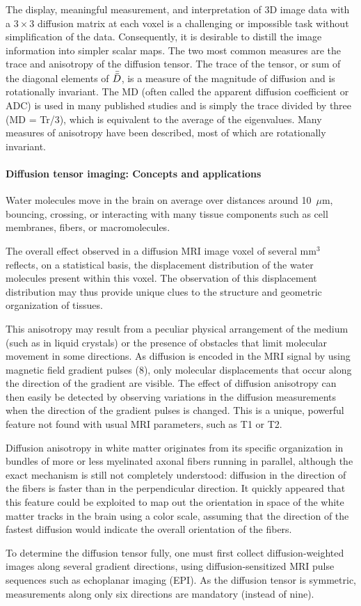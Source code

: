 {The display, meaningful measurement, and interpretation of 3D image data with a $3 \times 3$ diffusion matrix at each voxel is a challenging or impossible task without simplification of the data. Consequently, it is desirable to distill the image information into simpler scalar maps. The two most common measures are the trace and anisotropy of the diffusion tensor. The trace of the tensor, or sum of the diagonal elements of $\Bar{\bar{D}}$, is a measure of the magnitude of diffusion and is rotationally invariant. The MD (often called the apparent diffusion coefficient or ADC) is used in many published studies and is simply the trace divided by three (MD = Tr/3), which is equivalent to the average of the eigenvalues. Many measures of anisotropy have been described, most of which are rotationally invariant.}

\paragraph{Diffusion tensor imaging: Concepts and applications~\cite{lebihan2001}}{
Water molecules move in the brain on average over distances around 10~$\mu$m, bouncing, crossing, or interacting with many tissue components such as cell membranes, fibers, or macromolecules.

The overall effect observed in a diffusion MRI image voxel of several mm$^{3}$ reflects, on a statistical basis, the displacement distribution of the water molecules present within this voxel. The observation of this displacement distribution may thus provide unique clues to the structure and geometric organization of tissues.

This anisotropy may result from a peculiar physical arrangement of the medium (such as in liquid crystals) or the presence of obstacles that limit molecular movement in some directions. As diffusion is encoded in the MRI signal by using magnetic field gradient pulses (8), only molecular displacements that occur along the direction of the gradient are visible. The effect of diffusion anisotropy can then easily be detected by observing variations in the diffusion measurements when the direction of the gradient pulses is changed. This is a unique, powerful feature not found with usual MRI parameters, such as T1 or T2.

Diffusion anisotropy in white matter originates from its specific organization in bundles of more or less myelinated axonal fibers running in parallel, although the exact mechanism is still not completely understood: diffusion in the direction of the fibers is faster than in the perpendicular direction. It quickly appeared that this feature could be exploited to map out the orientation in space of the white matter tracks in the brain using a color scale, assuming that the direction of the fastest diffusion would indicate the overall orientation of the fibers.

To determine the diffusion tensor fully, one must first collect diffusion-weighted images along several gradient directions, using diffusion-sensitized MRI pulse sequences such as echoplanar imaging (EPI). As the diffusion tensor is symmetric, measurements along only six directions are mandatory (instead of nine).}

